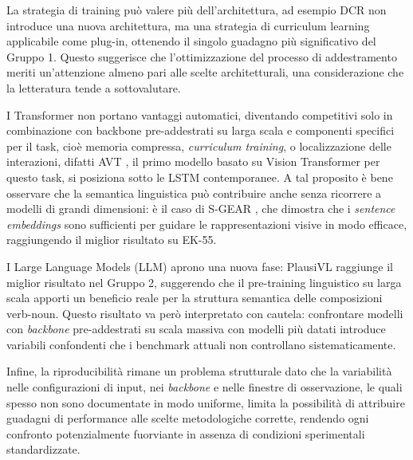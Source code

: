 La strategia di training può valere più dell'architettura, ad esempio DCR \cite{xu2022learning} non introduce una nuova architettura, ma una strategia di curriculum learning applicabile come plug-in, ottenendo il singolo guadagno più significativo del Gruppo 1. Questo suggerisce che l'ottimizzazione del processo di addestramento meriti un'attenzione almeno pari alle scelte architetturali, una considerazione che la letteratura tende a sottovalutare.

I Transformer non portano vantaggi automatici, diventando competitivi solo in combinazione con backbone pre-addestrati su larga scala e componenti specifici per il task, cioè memoria compressa, \textit{curriculum training}, o localizzazione delle interazioni, difatti AVT \cite{girdhar2021anticipative}, il primo modello basato su Vision Transformer per questo task, si posiziona sotto le LSTM contemporanee.
A tal proposito è bene osservare che la semantica linguistica può contribuire anche senza ricorrere a modelli di grandi dimensioni: è il caso di S-GEAR \cite{diko2024semantically}, che dimostra che i \textit{sentence embeddings} sono sufficienti per guidare le rappresentazioni visive in modo efficace, raggiungendo il miglior risultato su EK-55.

I Large Language Models (LLM) aprono una nuova fase: PlausiVL \cite{mittal2024can} raggiunge il miglior risultato nel Gruppo 2, suggerendo che il pre-training linguistico su larga scala apporti un beneficio reale per la struttura semantica delle composizioni verb-noun. Questo risultato va però interpretato con cautela: confrontare modelli con \textit{backbone} pre-addestrati su scala massiva con modelli più datati introduce variabili confondenti che i benchmark attuali non controllano sistematicamente. 

Infine, la riproducibilità rimane un problema strutturale dato che la variabilità nelle configurazioni di input, nei \textit{backbone} e nelle finestre di osservazione, le quali spesso non sono documentate in modo uniforme, limita la possibilità di attribuire guadagni di performance alle scelte metodologiche corrette, rendendo ogni confronto potenzialmente fuorviante in assenza di condizioni sperimentali standardizzate.
